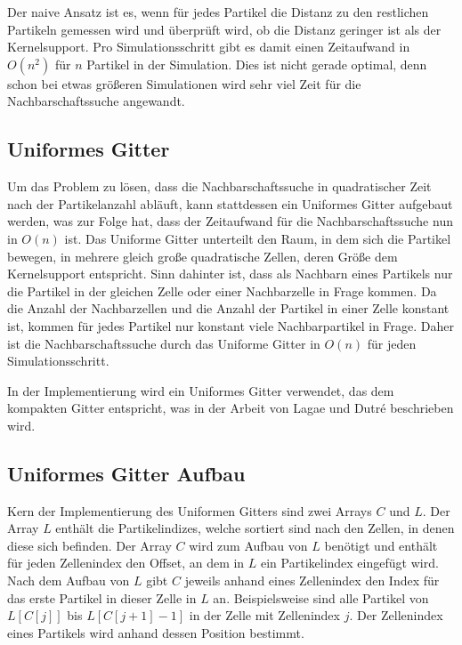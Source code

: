 \documentclass[11pt,
a4paper,
parskip=half, %
BCOR=10mm, %
english,
ngerman]{scrreprt}
\begin{document}
Der naive Ansatz ist es, wenn für jedes Partikel die Distanz zu den restlichen Partikeln gemessen wird und überprüft wird, ob die Distanz geringer ist als der Kernelsupport.
Pro Simulationsschritt gibt es damit einen Zeitaufwand in $O(n^2)$ für $n$ Partikel in der Simulation.
Dies ist nicht gerade optimal, denn schon bei etwas größeren Simulationen wird sehr viel Zeit für die Nachbarschaftssuche angewandt.


\subsection{Uniformes Gitter}
Um das Problem zu lösen, dass die Nachbarschaftssuche in quadratischer Zeit nach der Partikelanzahl abläuft,
kann stattdessen ein Uniformes Gitter aufgebaut werden, was zur Folge hat, dass der Zeitaufwand für die Nachbarschaftssuche nun in $O(n)$ ist.
Das Uniforme Gitter unterteilt den Raum, in dem sich die Partikel bewegen, in mehrere gleich große quadratische Zellen,
deren Größe dem Kernelsupport entspricht.
Sinn dahinter ist, dass als Nachbarn eines Partikels nur die Partikel in der gleichen Zelle oder einer Nachbarzelle in Frage kommen.
Da die Anzahl der Nachbarzellen und die Anzahl der Partikel in einer Zelle konstant ist,
kommen für jedes Partikel nur konstant viele Nachbarpartikel in Frage.
Daher ist die Nachbarschaftssuche durch das Uniforme Gitter in $O(n)$ für jeden Simulationsschritt.

In der Implementierung wird ein Uniformes Gitter verwendet, das dem kompakten Gitter entspricht,
was in der Arbeit von Lagae und Dutré \cite{lagae_compact_2008} beschrieben wird.

\subsection{Uniformes Gitter Aufbau}
Kern der Implementierung des Uniformen Gitters sind zwei Arrays $C$ und $L$.
Der Array $L$ enthält die Partikelindizes, welche sortiert sind nach den Zellen, in denen diese sich befinden.
Der Array $C$ wird zum Aufbau von $L$ benötigt und enthält für jeden Zellenindex den Offset, an dem in $L$ ein Partikelindex eingefügt wird.
Nach dem Aufbau von $L$ gibt $C$ jeweils anhand eines Zellenindex den Index für das erste Partikel in dieser Zelle in $L$ an.
Beispielsweise sind alle Partikel von $L[C[j]]$ bis $L[C[j+1] - 1]$ in der Zelle mit Zellenindex $j$.
Der Zellenindex eines Partikels wird anhand dessen Position bestimmt.


%
\end{document}
